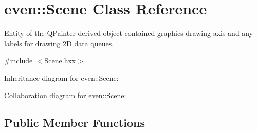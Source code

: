 \hypertarget{classeven_1_1_scene}{}\section{even\+:\+:Scene Class Reference}
\label{classeven_1_1_scene}


Entity of the Q\+Painter derived object contained graphics drawing axis and any labels for drawing 2D data queues.  




{\ttfamily \#include $<$Scene.\+hxx$>$}



Inheritance diagram for even\+:\+:Scene\+:


Collaboration diagram for even\+:\+:Scene\+:
\subsection*{Public Member Functions}

